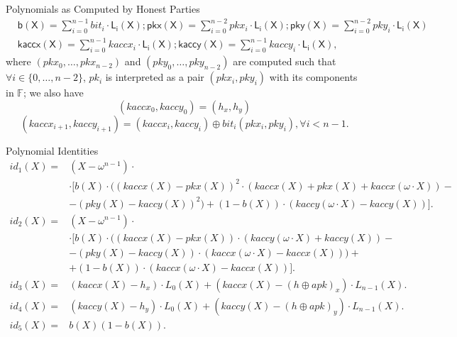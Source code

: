 \noindent \textsf{Polynomials as Computed by Honest Parties} 
\vspace{-0.1cm}
\begin{align*}
&\mathsf{b(X)} = \sum_{i=0}^{n-1} \mathit{bit_i} \cdot \mathsf{L_i(X)}; 
 \mathsf{pkx(X)} =  \sum_{i=0}^{n-2} \mathit{pkx_i} \cdot \mathsf{L_i(X)}; \mathsf{pky(X)} =  \sum_{i=0}^{n-2} \mathit{pky_i} \cdot \mathsf{L_i(X)} \\
&\mathsf{kaccx(X)}  =  \sum_{i=0}^{n-1} \mathit{kaccx_i} \cdot \mathsf{L_i(X)}; \mathsf{kaccy(X)}  = \sum_{i=0}^{n-1} \mathit{kaccy_i} \cdot \mathsf{L_i(X)}, 
\end{align*}
\noindent where $(\mathit{pkx_0}, \ldots, \mathit{pkx_{n-2}})$ 
and $(\mathit{pky_0}, \ldots, \mathit{pky_{n-2}})$ are computed such that\\ $\forall i \in \{0, \ldots, n-2\}$, $\mathit{pk_i}$ 
is interpreted as a pair $(\mathit{pkx_i}, \mathit{pky_i})$ with its components in $\mathbb{F}$; we also have 
$$(\mathit{kaccx_{0}}, \mathit{kaccy_{0}}) = (\mathit{h_x}, \mathit{h_y})$$
$$(\mathit{kaccx_{i+1}}, \mathit{kaccy_{i+1}}) = (\mathit{kaccx_{i}}, \mathit{kaccy_{i}}) \oplus \mathit{bit_i}(\mathit{pkx_{i}}, \mathit{pky_{i}}), \forall i < n-1.$$ %

\vspace{0.1cm}

\noindent \textsf{Polynomial Identities} 
\begin{align*}
id_1(X) = & (X-\omega^{n-1}) \cdot \\
& \cdot [b(X) \cdot ((kaccx(X)-pkx(X))^2 \cdot (kaccx(X)+ pkx(X) + kaccx(\omega\cdot X)) - \\
&- (pky(X) - kaccy(X))^2) + (1-b(X)) \cdot (kaccy(\omega\cdot X) - kaccy(X))]. \\
id_2(X)  =  & (X-\omega^{n-1})\cdot \\ 
& \cdot [b(X) \cdot ((kaccx(X) - pkx(X)) \cdot (kaccy(\omega \cdot X) + kaccy(X)) -  \\
& - (pky(X) - kaccy(X)) \cdot (kaccx(\omega \cdot X) - kaccx(X))) + \\
& + (1-b(X)) \cdot (kaccx(\omega \cdot X) - kaccx(X))]. \\
id_3(X)  =  & (kaccx(X) - h_x)\cdot L_0(X) + (kaccx(X) - (h\oplus apk)_{x})  \cdot L_{n-1}(X).  \\
id_4(X) =  & (kaccy(X) - h_y)\cdot L_0(X) + (kaccy(X)  - (h\oplus apk)_{y}) \cdot L_{n-1}(X). \\
id_5(X) =  & b(X)(1-b(X)).
\end{align*}

